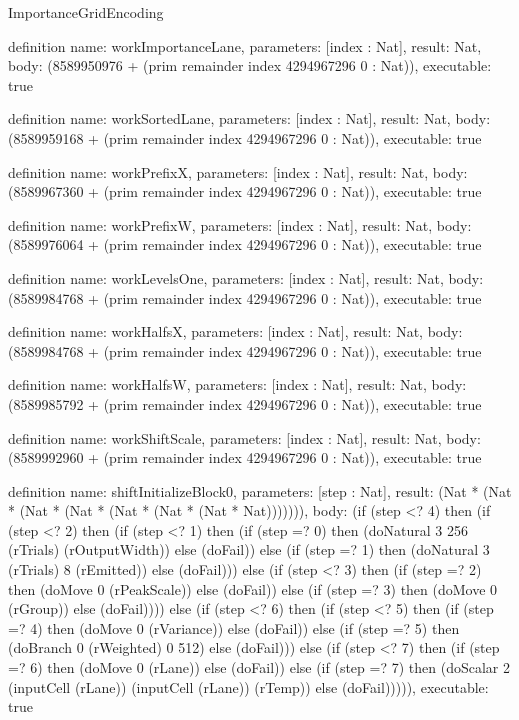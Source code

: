 \begin{lexlean}{ImportanceGridEncoding}
\begin{semanticmodule}
definition{
  name: workImportanceLane,
  parameters: [index : Nat],
  result: Nat,
  body: (8589950976 + (prim remainder index 4294967296 0 : Nat)),
  executable: true
}

definition{
  name: workSortedLane,
  parameters: [index : Nat],
  result: Nat,
  body: (8589959168 + (prim remainder index 4294967296 0 : Nat)),
  executable: true
}

definition{
  name: workPrefixX,
  parameters: [index : Nat],
  result: Nat,
  body: (8589967360 + (prim remainder index 4294967296 0 : Nat)),
  executable: true
}

definition{
  name: workPrefixW,
  parameters: [index : Nat],
  result: Nat,
  body: (8589976064 + (prim remainder index 4294967296 0 : Nat)),
  executable: true
}

definition{
  name: workLevelsOne,
  parameters: [index : Nat],
  result: Nat,
  body: (8589984768 + (prim remainder index 4294967296 0 : Nat)),
  executable: true
}

definition{
  name: workHalfsX,
  parameters: [index : Nat],
  result: Nat,
  body: (8589984768 + (prim remainder index 4294967296 0 : Nat)),
  executable: true
}

definition{
  name: workHalfsW,
  parameters: [index : Nat],
  result: Nat,
  body: (8589985792 + (prim remainder index 4294967296 0 : Nat)),
  executable: true
}

definition{
  name: workShiftScale,
  parameters: [index : Nat],
  result: Nat,
  body: (8589992960 + (prim remainder index 4294967296 0 : Nat)),
  executable: true
}

definition{
  name: shiftInitializeBlock0,
  parameters: [step : Nat],
  result: (Nat * (Nat * (Nat * (Nat * (Nat * (Nat * (Nat * Nat))))))),
  body: (if (step <? 4) then
      (if (step <? 2) then
      (if (step <? 1) then
      (if (step =? 0) then (doNatural 3 256 (rTrials) (rOutputWidth)) else (doFail)) else
      (if (step =? 1) then (doNatural 3 (rTrials) 8 (rEmitted)) else (doFail))) else
      (if (step <? 3) then
      (if (step =? 2) then (doMove 0 (rPeakScale)) else (doFail)) else
      (if (step =? 3) then (doMove 0 (rGroup)) else (doFail)))) else
      (if (step <? 6) then
      (if (step <? 5) then
      (if (step =? 4) then (doMove 0 (rVariance)) else (doFail)) else
      (if (step =? 5) then (doBranch 0 (rWeighted) 0 512) else (doFail))) else
      (if (step <? 7) then
      (if (step =? 6) then (doMove 0 (rLane)) else (doFail)) else
      (if (step =? 7) then (doScalar 2 (inputCell (rLane)) (inputCell (rLane)) (rTemp)) else (doFail))))),
  executable: true
}


\end{semanticmodule}
\end{lexlean}
